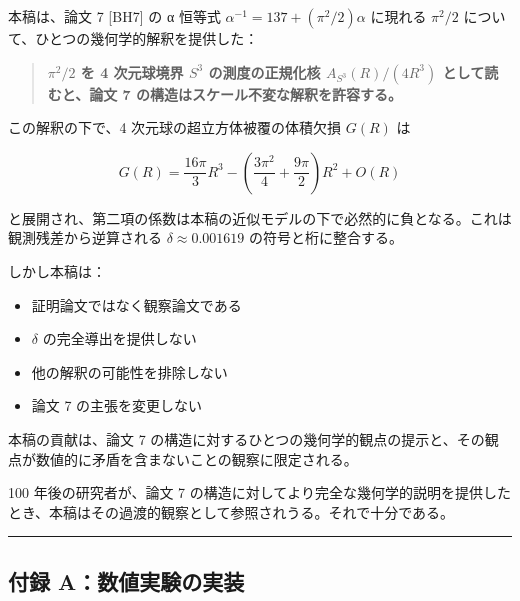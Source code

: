 \documentclass[
]{article}
\providecommand{\tightlist}{%
  \setlength{\itemsep}{0pt}\setlength{\parskip}{0pt}}
\begin{document}
本稿は、論文 7 {[}BH7{]} の α 恒等式
\(\alpha^{-1} = 137 + (\pi^2/2)\alpha\) に現れる \(\pi^2/2\)
について、ひとつの幾何学的解釈を提供した：

\begin{quote}
\textbf{\(\pi^2/2\) を 4 次元球境界 \(S^3\) の測度の正規化核
\(A_{S^3}(R)/(4R^3)\) として読むと、論文 7
の構造はスケール不変な解釈を許容する。}
\end{quote}

この解釈の下で、4 次元球の超立方体被覆の体積欠損 \(G(R)\) は

\[G(R) = \frac{16\pi}{3}R^3 - \left(\frac{3\pi^2}{4} + \frac{9\pi}{2}\right)R^2 + O(R)\]

と展開され、第二項の係数は本稿の近似モデルの下で必然的に負となる。これは観測残差から逆算される
\(\delta \approx 0.001619\) の符号と桁に整合する。

しかし本稿は：

\begin{itemize}
\tightlist
\item
  証明論文ではなく観察論文である
\item
  \(\delta\) の完全導出を提供しない
\item
  他の解釈の可能性を排除しない
\item
  論文 7 の主張を変更しない
\end{itemize}

本稿の貢献は、論文 7
の構造に対するひとつの幾何学的観点の提示と、その観点が数値的に矛盾を含まないことの観察に限定される。

100 年後の研究者が、論文 7
の構造に対してより完全な幾何学的説明を提供したとき、本稿はその過渡的観察として参照されうる。それで十分である。

\begin{center}\rule{0.5\linewidth}{0.5pt}\end{center}

\subsection{付録
A：数値実験の実装}\label{ux4ed8ux9332-aux6570ux5024ux5b9fux9a13ux306eux5b9fux88c5}
\end{document}
